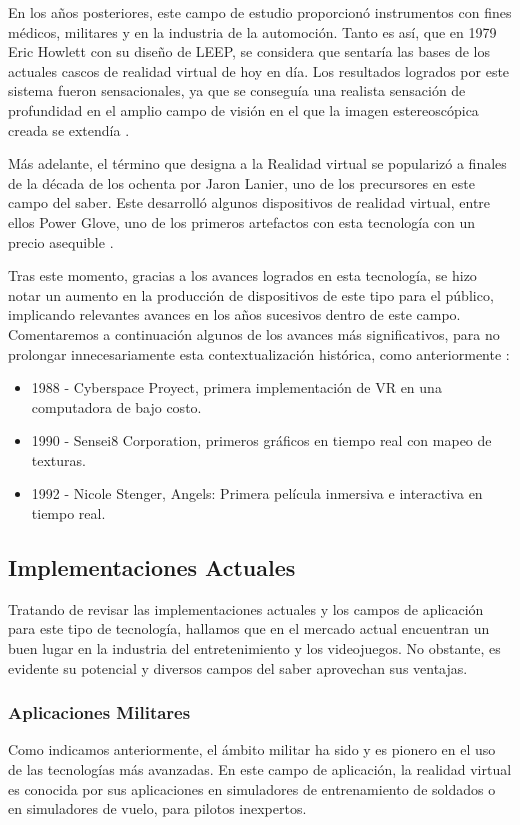 En los años posteriores, este campo de estudio proporcionó instrumentos con fines médicos, militares y en la industria de la automoción. Tanto es así, que en 1979 Eric Howlett con su diseño de LEEP, se considera que sentaría las bases de los actuales cascos de realidad virtual de hoy en día. Los resultados logrados por este sistema fueron sensacionales, ya que se conseguía una realista sensación de profundidad en el amplio campo de visión en el que la imagen estereoscópica creada se extendía \cite{22}.

Más adelante, el término que designa a la Realidad virtual se popularizó a finales de la década de los ochenta por Jaron Lanier, uno de los precursores en este campo del saber. Este desarrolló algunos dispositivos de realidad virtual, entre ellos Power Glove, uno de los primeros artefactos  con esta tecnología con un precio asequible \cite{23}.

Tras este momento, gracias a los avances logrados en esta tecnología, se hizo notar un aumento en la producción de dispositivos de este tipo para el público, implicando relevantes avances en los años sucesivos dentro de este campo. Comentaremos a continuación algunos de los avances más significativos, para no prolongar innecesariamente esta contextualización histórica, como anteriormente \cite{24}:

\begin{itemize}
    \item 1988 - Cyberspace Proyect, primera implementación de VR en una computadora de bajo costo.
    \item 1990 - Sensei8 Corporation, primeros gráficos en tiempo real con mapeo de texturas.
    \item 1992 - Nicole Stenger, Angels: Primera película inmersiva e interactiva en tiempo real.
\end{itemize}


\subsection{Implementaciones Actuales}
Tratando de revisar las implementaciones actuales y los campos de aplicación para este tipo de tecnología, hallamos que en el mercado actual encuentran un buen lugar en la industria del entretenimiento y los videojuegos. No obstante, es evidente su potencial y diversos campos del saber aprovechan sus ventajas.

\subsubsection{Aplicaciones Militares}
Como indicamos anteriormente, el ámbito militar ha sido y es pionero en el uso de las tecnologías más avanzadas. En este campo de aplicación, la realidad virtual es conocida por sus aplicaciones en simuladores de entrenamiento de soldados o en simuladores de vuelo,  para pilotos inexpertos.

